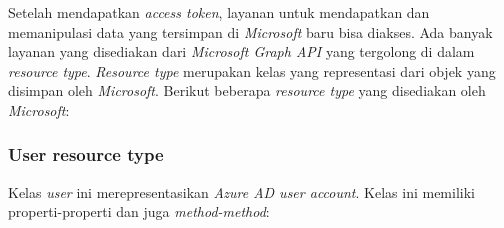 Setelah mendapatkan \textit{access token}, layanan untuk mendapatkan dan memanipulasi data yang tersimpan di \textit{Microsoft} baru bisa diakses. Ada banyak layanan yang disediakan dari \textit{Microsoft Graph API} yang tergolong di dalam \textit{resource type}. \textit{Resource type} merupakan kelas yang representasi dari objek yang disimpan oleh \textit{Microsoft}. Berikut beberapa \textit{resource type} yang disediakan oleh \textit{Microsoft}:

\subsubsection{User resource type}
Kelas \textit{user} ini merepresentasikan \textit{Azure AD user account}. Kelas ini memiliki properti-properti dan juga \textit{method-method}:\\

